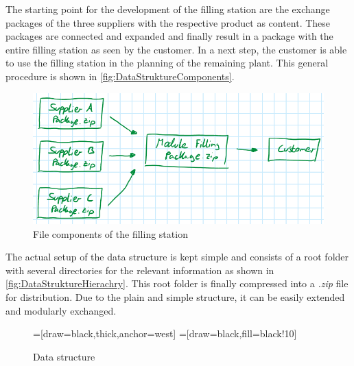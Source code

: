 	The starting point for the development of the filling station are the exchange packages of the three suppliers with the respective product as content. These packages are connected and expanded and finally result in a package with the entire filling station as seen by the customer. In a next step, the customer is able to use the filling station in the planning of the remaining plant. This general procedure is shown in \autoref{fig:DataStruktureComponents}.
	\begin{figure}[htp]
		\centering
		\includegraphics[width=.8\linewidth]{figures/StruktureFile.PNG}
		\caption{File components of the filling station}
		\label{fig:DataStruktureComponents}
	\end{figure}

	The actual setup of the data structure is kept simple and consists of a root folder with several directories for the relevant information as shown in \autoref{fig:DataStruktureHierachry}. This root folder is finally compressed into a \textit{.zip} file for distribution. Due to the plain and simple structure, it can be easily extended and modularly exchanged.  
	\begin{figure}[htp]
		\centering
		\scriptsize
		=[draw=black,thick,anchor=west]
		=[draw=black,fill=black!10]
		\caption{Data structure}
		\label{fig:DataStruktureHierachry}
	\end{figure}



